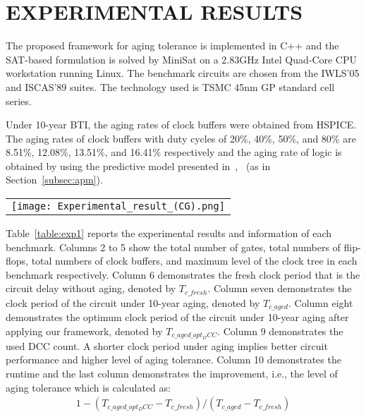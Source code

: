 \section{EXPERIMENTAL RESULTS}
\label{sec:exp}
The proposed framework for aging tolerance is implemented in C++ and the SAT-based formulation is solved by MiniSat on a 2.83GHz Intel Quad-Core CPU workstation running Linux. The benchmark circuits are chosen from the IWLS'05 and ISCAS'89 suites. The technology used is TSMC 45nm GP standard cell series.

Under 10-year BTI, the aging rates of clock buffers were obtained from HSPICE. The aging rates of clock buffers with duty cycles of 20\%, 40\%, 50\%, and 80\% are 8.51\%, 12.08\%, 13.51\%, and 16.41\% respectively and the aging rate of logic is obtained by using the predictive model presented in~\cite{wang2010impact},~\cite{wang2007efficient} (as in Section~\ref{subsec:apm}).

\begin{table*}
\centering
\caption{Results of aging tolerance}
	\begin{tabular}{l}
	\texttt{[image: Experimental\_result\_(CG).png]}
	\end{tabular}
\label{table:exp1}
\end{table*}

Table~\ref{table:exp1} reports the experimental results and information of each benchmark. Columns 2 to 5 show the total number of gates, total numbers of flip-flops, total numbers of clock buffers, and maximum level of the clock tree in each benchmark respectively. Column 6 demonstrates the fresh clock period that is the circuit delay without aging, denoted by $T_{c\_fresh}$. Column seven demonstrates the clock period of the circuit under 10-year aging, denoted by $T_{c\_aged}$. Column eight demonstrates the optimum clock period of the circuit under 10-year aging after applying our framework, denoted by $T_{c\_aged\_opt_DCC}$. Column 9 demonstrates the used DCC count. A shorter clock period under aging implies better circuit performance and higher level of aging tolerance. Column 10 demonstrates the runtime and the last column demonstrates the improvement, i.e., the level of aging tolerance which is calculated as:
\begin{gather*}
1 - (T_{c\_aged\_opt_DCC} - T_{c\_fresh}) / (T_{c\_aged} - T_{c\_fresh})
\end{gather*}

